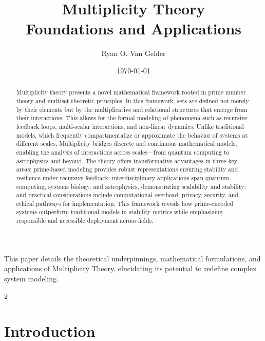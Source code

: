 \documentclass{article}
\theoremstyle{plain}
\begin{document}
\title{Multiplicity Theory\\Foundations and Applications}

\author{Ryan O. Van Gelder}
\date{\today}

\maketitle
\nolinenumbers
\begin{abstract}
Multiplicity theory presents a novel mathematical framework rooted in prime number theory and multiset-theoretic principles. In this framework, sets are defined not merely by their elements but by the multiplicative and relational structures that emerge from their interactions. This allows for the formal modeling of phenomena such as recursive feedback loops, multi-scalar interactions, and non-linear dynamics. Unlike traditional models, which frequently compartmentalize or approximate the behavior of systems at different scales, Multiplicity bridges discrete and continuous mathematical models, enabling the analysis of interactions across scales—from quantum computing to astrophysics and beyond. The theory offers transformative advantages in three key areas: prime-based modeling provides robust representations ensuring stability and resilience under recursive feedback; interdisciplinary applications span quantum computing, systems biology, and astrophysics, demonstrating scalability and stability; and practical considerations include computational overhead, privacy, security, and ethical pathways for implementation. This framework reveals how prime-encoded systems outperform traditional models in stability metrics while emphasizing responsible and accessible deployment across fields.
\end{abstract}


This paper details the theoretical underpinnings, mathematical formulations, and applications of Multiplicity Theory, elucidating its potential to redefine complex system modeling.
\newpage
 \begin{multicols}{2}
\begin{singlespace}
\tableofcontents
\end{singlespace}
\end{multicols}
\linenumbers
\section{Introduction}
\end{document}
